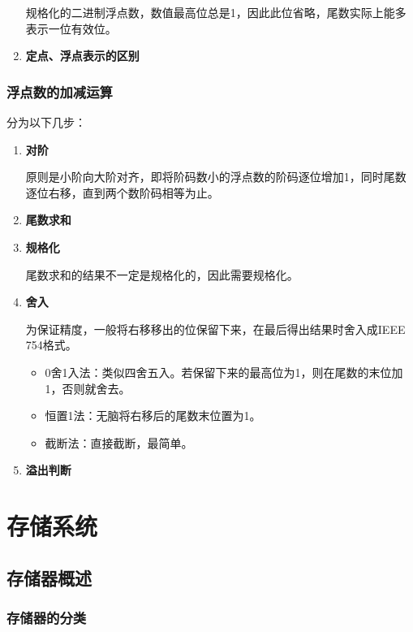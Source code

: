 \documentclass[12pt, a4paper, oneside]{ctexart}
\begin{document}
\begin{enumerate}
  规格化的二进制浮点数，数值最高位总是1，因此此位省略，尾数实际上能多表示一位有效位。
  \item {\bf 定点、浮点表示的区别}
\end{enumerate}

\subsubsection{浮点数的加减运算}

分为以下几步：
\begin{enumerate}
  \item {\bf 对阶}
  
  原则是小阶向大阶对齐，即将阶码数小的浮点数的阶码逐位增加1，同时尾数逐位右移，直到两个数阶码相等为止。
  \item {\bf 尾数求和}
  \item {\bf 规格化}
  
  尾数求和的结果不一定是规格化的，因此需要规格化。
  \item {\bf 舍入}
  
  为保证精度，一般将右移移出的位保留下来，在最后得出结果时舍入成IEEE 754格式。
  \begin{itemize}
    \item 0舍1入法：类似四舍五入。若保留下来的最高位为1，则在尾数的末位加1，否则就舍去。
    \item 恒置1法：无脑将右移后的尾数末位置为1。
    \item 截断法：直接截断，最简单。
  \end{itemize}
  \item {\bf 溢出判断}
\end{enumerate}

\section{存储系统}

\subsection{存储器概述}

\subsubsection{存储器的分类}
\end{document}
